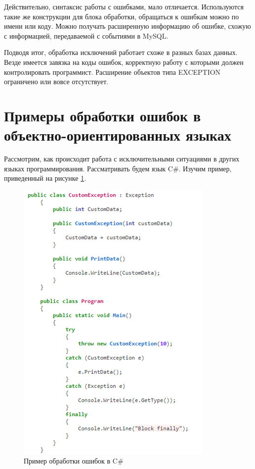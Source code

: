 Действительно, синтаксис работы с ошибками, мало отличается. Используются такие же конструкции для блока обработки, обращаться к ошибкам можно по имени или коду. Можно получать расширенную информацию об ошибке, схожую с информацией, передаваемой с событиями в MySQL. 

Подводя итог, обработка исключений работает схоже в разных базах данных. Везде имеется завязка на коды ошибок, корректную работу с которыми должен контролировать программист. Расширение объектов типа EXCEPTION ограничено или вовсе отсутствует. 

\section{Примеры обработки ошибок в объектно-ориентированных языках}\label{ch2:sec4}

Рассмотрим, как происходит работа с исключительными ситуациями в других языках программирования. Рассматривать будем язык C\#. Изучим пример, приведенный на рисунке \ref{fig:C2_c_sharp_user_defined_exceptions}. 

\begin{figure}[ht!] 
	\center
	\includegraphics [scale=1] {my_folder/img/C2_c_sharp_user_defined_exceptions}
	\caption{Пример обработки ошибок в C\#} 
	\label{fig:C2_c_sharp_user_defined_exceptions}  
\end{figure}
\FloatBarrier

